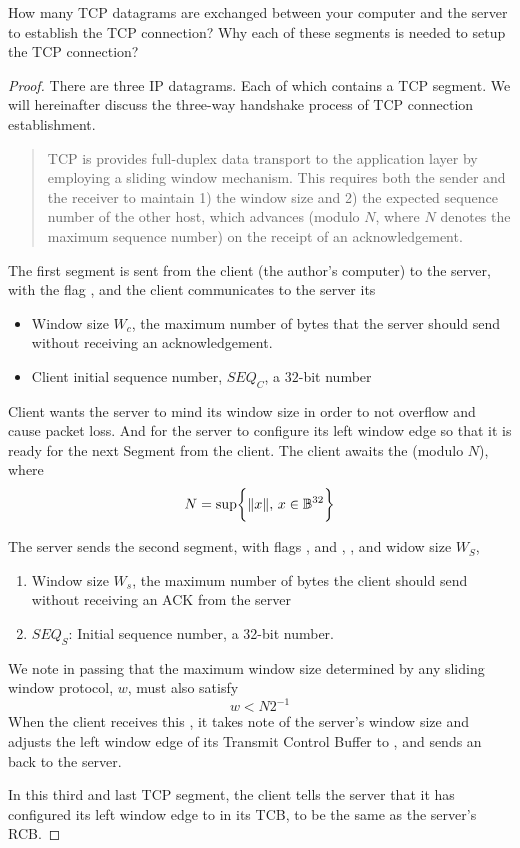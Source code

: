 \documentclass[../main.tex]{subfiles}
\begin{document}
\begin{wts}
	How many TCP datagrams are exchanged between your computer and the server to establish the TCP connection? Why each of these segments is needed to setup the TCP connection?
\end{wts}
\begin{proof}
    There are three IP datagrams. Each of which contains a TCP segment. We will hereinafter discuss the three-way handshake process of TCP connection establishment.

\begin{quote}
    TCP is provides full-duplex data transport to the application layer by employing a sliding window mechanism. This requires both the sender and the receiver to maintain 1) the window size and 2) the expected sequence number of the other host, which advances (modulo $N$, where $N$ denotes the maximum sequence number) on the receipt of an acknowledgement.
\end{quote}
The first segment is sent from the client (the author’s computer) to the server, with the flag , and the client communicates to the server its
\begin{itemize}
    \item Window size $W_c$, the maximum number of bytes that the server should send without receiving an acknowledgement.
    \item Client initial sequence number, ${SEQ}_C$, a $32$-bit number 
\end{itemize}
Client wants the server to mind its window size in order to not overflow and cause packet loss. 
And for the server to configure its left window edge so that it is ready for the next Segment from the client. The client awaits the  (modulo $N$), where
\begin{equation}\label{mod n}
N = \sup\biggl\{\lVert {x} \rVert,\,x\in\mathbb{B}^{32}\biggr\}\end{equation}

The server sends the second segment, with flags , and , , and widow size $W_S$,
\begin{enumerate}
    \item Window size $W_s$, the maximum number of bytes the client should send without receiving an ACK from the server
    \item $SEQ_S$: Initial sequence number, a 32-bit number.
\end{enumerate} 
We note in passing that the maximum window size determined by any sliding window protocol, $w$, must also satisfy \[w< N2^{-1}\]When the client receives this , it takes note of the server’s window size and adjusts the left window edge of its Transmit Control Buffer to , and sends an  back to the server.

In this third and last TCP segment, the client tells the server that it has configured its left window edge to  in its TCB, to be the same as the server’s RCB.

\end{proof}
\newpage
\end{document}

